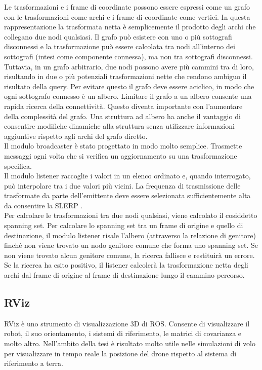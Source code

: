 Le trasformazioni e i frame di coordinate possono essere espressi come un grafo con le trasformazioni come archi e i frame di coordinate come vertici. In questa rappresentazione la trasformata netta è semplicemente il prodotto degli archi che collegano due nodi qualsiasi. Il grafo può esistere con uno o più sottografi disconnessi e la trasformazione può essere calcolata tra nodi all'interno dei sottografi (intesi come componente connessa), ma non tra sottografi disconnessi. Tuttavia, in un grafo arbitrario, due nodi possono avere più cammini tra di loro, risultando in due o più potenziali trasformazioni nette che rendono ambiguo il risultato della query. Per evitare questo il grafo deve essere aciclico, in modo che ogni sottografo connesso è un albero. Limitare il grafo a un albero consente una rapida ricerca della connettività. Questo diventa importante con l'aumentare della complessità del grafo. Una struttura ad albero ha anche il vantaggio di consentire modifiche dinamiche alla struttura senza utilizzare informazioni aggiuntive rispetto agli archi del grafo diretto.\\

Il modulo broadcaster è stato progettato in modo molto semplice. Trasmette messaggi ogni volta che si verifica un aggiornamento su una trasformazione specifica.\\

Il modulo listener raccoglie i valori in un elenco ordinato e, quando interrogato, può interpolare tra i due valori più vicini. La frequenza di trasmissione delle trasformate da parte dell'emittente deve essere selezionata sufficientemente alta da consentire la \ac{SLERP} \cite{SLERP}.\\

Per calcolare le trasformazioni tra due nodi qualsiasi, viene calcolato il cosiddetto spanning set. Per calcolare lo spanning set tra un frame di origine e quello di destinazione, il modulo listener risale l'albero (attraverso la relazione di genitore) finché non viene trovato un nodo genitore comune che forma uno spanning set. Se non viene trovato alcun genitore comune, la ricerca fallisce e restituirà un errore. Se la ricerca ha esito positivo, il listener calcolerà la trasformazione netta degli archi dal frame di origine al frame di destinazione lungo il cammino percorso.

\subsection{RViz}
\ac{RViz} è uno strumento di visualizzazione 3D di \acs{ROS}. Consente di visualizzare il robot, il suo orientamento, i sistemi di riferimento, le matrici di covarianza e molto altro. Nell'ambito della tesi è risultato molto utile nelle simulazioni di volo per visualizzare in tempo reale la posizione del drone rispetto al sistema di riferimento a terra.

